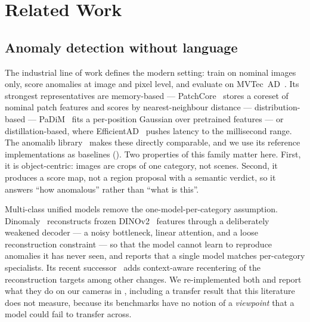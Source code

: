 %
\section{Related Work}
\label{sec:related}

\subsection{Anomaly detection without language}
\label{sec:related:novlm}

The industrial line of work defines the modern setting: train on nominal
images only, score anomalies at image and pixel level, and evaluate on
MVTec~AD~\cite{Bergmann_2019}. Its strongest representatives are memory-based
--- PatchCore~\cite{Roth_2022} stores a coreset of nominal patch features and
scores by nearest-neighbour distance --- distribution-based
--- PaDiM~\cite{Defard_2021} fits a per-position Gaussian over pretrained
features --- or distillation-based, where EfficientAD~\cite{Batzner_2024}
pushes latency to the millisecond range. The anomalib
library~\cite{Akcay_2022} makes these directly comparable, and we use its
reference implementations as baselines ().
Two properties of this family matter here. First, it is object-centric: images
are crops of one category, not scenes. Second, it produces a score map, not a
region proposal with a semantic verdict, so it answers ``how anomalous'' rather
than ``what is this''.

Multi-class unified models remove the one-model-per-category assumption.
Dinomaly~\cite{Guo_2025} reconstructs frozen DINOv2~\cite{Oquab_2023} features
through a deliberately weakened decoder --- a noisy bottleneck, linear
attention, and a loose reconstruction constraint --- so that the model cannot
learn to reproduce anomalies it has never seen, and reports that a single
model matches per-category specialists. Its recent
successor~\cite{Guo_2025_dinomaly2} adds context-aware recentering of the
reconstruction targets among other changes. We re-implemented both and report
what they do on our cameras in , including a
transfer result that this literature does not measure, because its benchmarks
have no notion of a \emph{viewpoint} that a model could fail to transfer
across.

